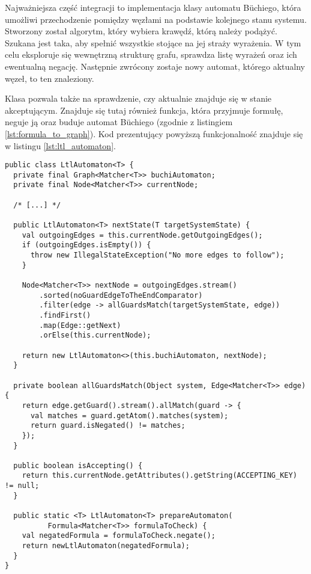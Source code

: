 Najważniejsza część integracji to implementacja klasy automatu Büchiego, która umożliwi przechodzenie pomiędzy węzłami na podstawie kolejnego stanu systemu.
Stworzony został algorytm, który wybiera krawędź, którą należy podążyć.
Szukana jest taka, aby spełnić wszystkie stojące na jej straży wyrażenia.
W tym celu eksploruje się wewnętrzną strukturę grafu, sprawdza listę wyrażeń oraz ich ewentualną negację.
Następnie zwrócony zostaje nowy automat, którego aktualny węzeł, to ten znaleziony.

Klasa pozwala także na sprawdzenie, czy aktualnie znajduje się w stanie akceptującym.
Znajduje się tutaj również funkcja, która przyjmuje formułę, neguje ją oraz buduje automat Büchiego (zgodnie z listingiem \ref{lst:formula_to_graph}).
Kod prezentujący powyższą funkcjonalność znajduje się w listingu \ref{lst:ltl_automaton}.

\begin{minipage}{\linewidth}
\begin{lstlisting}[caption={Implementacja automatu Büchiego.},captionpos=b,label={lst:ltl_automaton}]
public class LtlAutomaton<T> {
  private final Graph<Matcher<T>> buchiAutomaton;
  private final Node<Matcher<T>> currentNode;

  /* [...] */

  public LtlAutomaton<T> nextState(T targetSystemState) {
    val outgoingEdges = this.currentNode.getOutgoingEdges();
    if (outgoingEdges.isEmpty()) {
      throw new IllegalStateException("No more edges to follow");
    }

    Node<Matcher<T>> nextNode = outgoingEdges.stream()
        .sorted(noGuardEdgeToTheEndComparator)
        .filter(edge -> allGuardsMatch(targetSystemState, edge))
        .findFirst()
        .map(Edge::getNext)
        .orElse(this.currentNode);

    return new LtlAutomaton<>(this.buchiAutomaton, nextNode);
  }

  private boolean allGuardsMatch(Object system, Edge<Matcher<T>> edge) {
    return edge.getGuard().stream().allMatch(guard -> {
      val matches = guard.getAtom().matches(system);
      return guard.isNegated() != matches;
    });
  }

  public boolean isAccepting() {
    return this.currentNode.getAttributes().getString(ACCEPTING_KEY) != null;
  }

  public static <T> LtlAutomaton<T> prepareAutomaton(
          Formula<Matcher<T>> formulaToCheck) {
    val negatedFormula = formulaToCheck.negate();
    return newLtlAutomaton(negatedFormula);
  }
}

\end{lstlisting}
\end{minipage}

